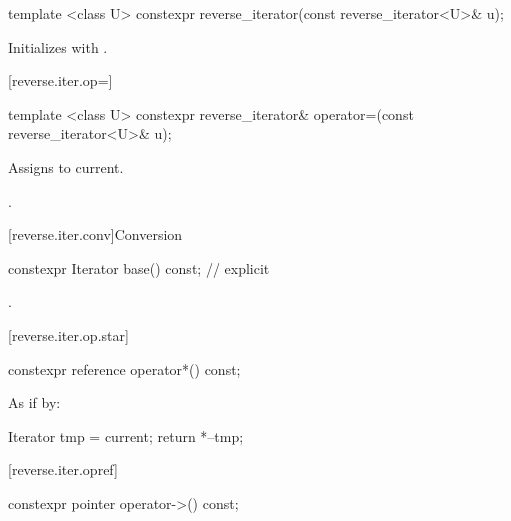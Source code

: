 %
\begin{itemdecl}
template <class U> constexpr reverse_iterator(const reverse_iterator<U>& u);
\end{itemdecl}

\begin{itemdescr}
\pnum
\effects
Initializes
with
.
\end{itemdescr}

[reverse.iter.op=]{}

%
\begin{itemdecl}
template <class U>
constexpr reverse_iterator&
  operator=(const reverse_iterator<U>& u);
\end{itemdecl}

\begin{itemdescr}
\pnum
\effects
Assigns  to current.

\pnum
\returns
{}.
\end{itemdescr}

[reverse.iter.conv]{Conversion}

%
\begin{itemdecl}
constexpr Iterator base() const;          // explicit
\end{itemdecl}

\begin{itemdescr}
\pnum
\returns
{}.
\end{itemdescr}

[reverse.iter.op.star]{}

%
\begin{itemdecl}
constexpr reference operator*() const;
\end{itemdecl}

\begin{itemdescr}
\pnum
\effects
As if by:
\begin{codeblock}
Iterator tmp = current;
return *--tmp;
\end{codeblock}

\end{itemdescr}

[reverse.iter.opref]{}

%
\begin{itemdecl}
constexpr pointer operator->() const;
\end{itemdecl}

